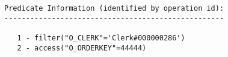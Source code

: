 \documentclass[11pt,a4paper,parskip=half]{scrartcl}
\begin{document}
\begin{lstlisting}
Predicate Information (identified by operation id):                                                                                                                                                                                                                                                          
---------------------------------------------------                                                                                                                                                                                                                                                          
                                                                                                                                                                                                                                                                                                             
   1 - filter("O_CLERK"='Clerk#000000286')                                                                                                                                                                                                                                                                   
   2 - access("O_ORDERKEY"=44444) 
\end{lstlisting}
\end{document}
